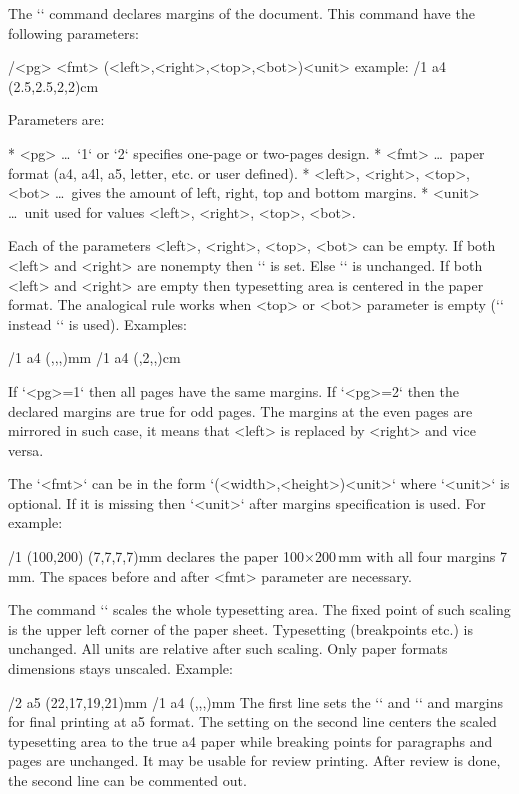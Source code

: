{\begtt
{} 
\endtt

The `\margins` command declares margins of the document. This command have
the following parameters:

\begtt
\margins/<pg> <fmt> (<left>,<right>,<top>,<bot>)<unit>
  example:
\margins/1 a4 (2.5,2.5,2,2)cm
\endtt

Parameters are:

\begitems
* <pg> \dots\ `1` or `2` specifies one-page or two-pages design.
* <fmt> \dots\ paper format (a4, a4l, a5, letter, etc. or user defined).
* <left>, <right>, <top>, <bot> \dots\ gives the amount of left, right,
      top and bottom margins.
* <unit> \dots\ unit used for values <left>, <right>, <top>, <bot>.
\enditems

Each of the parameters <left>, <right>, <top>, <bot> can be empty.
If both <left> and <right> are nonempty then `\hsize` is set. Else `\hsize`
is unchanged. If both <left> and <right> are empty then typesetting area is
centered in the paper format. The analogical rule works when <top> or <bot>
parameter is empty (`\vsize` instead `\hsize` is used). Examples:

\begtt
\margins/1 a4 (,,,)mm   %
\margins/1 a4 (,2,,)cm  %
\endtt

If `<pg>=1` then all pages have the same margins. If `<pg>=2` then the
declared margins are true for odd pages. The margins at the even pages are
mirrored in such case, it means that <left> is replaced by <right> and vice
versa.

The `<fmt>` can be in the form `(<width>,<height>)<unit>` where `<unit>` is
optional. If it is missing then `<unit>` after margins specification is
used. For example:

\begtt
\margins/1 (100,200) (7,7,7,7)mm
\endtt
%
declares the paper 100$\times$200\,mm with all four margins 7\,mm. The spaces
before and after <fmt> parameter are necessary.

The command `\magscale[<factor>]` scales the whole typesetting area. 
\new The fixed point of such scaling is the upper left corner of the paper sheet. 
Typesetting (breakpoints etc.) is unchanged. All units are relative after
such scaling. Only paper formats dimensions stays unscaled. Example:

\begtt
\margins/2 a5 (22,17,19,21)mm
\magscale[1414] \margins/1 a4 (,,,)mm
\endtt
%
The first line sets the `\hsize` and `\vsize` and margins for final
printing at a5 format. The setting on the second line centers the scaled 
typesetting area to the true a4 paper while breaking points for paragraphs
and pages are unchanged. It may be usable for 
review printing. After review is done, the second line can be commented out.


}
